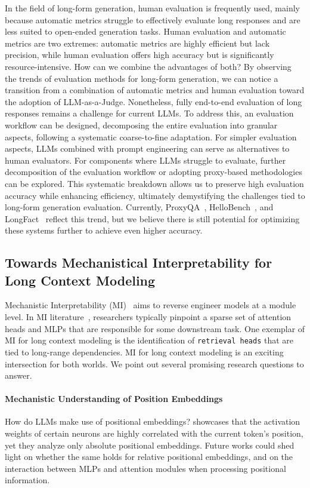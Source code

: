 \documentclass[11pt, a4paper, logo, copyright, nonumbering]{map}
\begin{document}
In the field of long-form generation, human evaluation is frequently used, mainly because automatic metrics struggle to effectively evaluate long responses and are less suited to open-ended generation tasks. 
Human evaluation and automatic metrics are two extremes: automatic metrics are highly efficient but lack precision, while human evaluation offers high accuracy but is significantly resource-intensive. How can we combine the advantages of both? 
By observing the trends of evaluation methods for long-form generation, we can notice a transition from a combination of automatic metrics and human evaluation toward the adoption of LLM-as-a-Judge. 
Nonetheless, fully end-to-end evaluation of long responses remains a challenge for current LLMs. To address this, an evaluation workflow can be designed, decomposing the entire evaluation into granular aspects, following a systematic coarse-to-fine adaptation. For simpler evaluation aspects, LLMs combined with prompt engineering can serve as alternatives to human evaluators. 
For components where LLMs struggle to evaluate, further decomposition of the evaluation workflow or adopting proxy-based methodologies can be explored. This systematic breakdown allows us to preserve high evaluation accuracy while enhancing efficiency, ultimately demystifying the challenges tied to long-form generation evaluation. 
Currently, ProxyQA~\citep{tan2024proxyqa}, HelloBench~\citep{que2024hellobench}, and LongFact~\citep{wei2024long} reflect this trend, but we believe there is still potential for optimizing these systems further to achieve even higher accuracy.


\subsection{Towards Mechanistical Interpretability for Long Context Modeling}
Mechanistic Interpretability (MI)~\citep{nanda2023mechanistic} aims to reverse engineer models at a module level. In MI literature~\citep{meng2022locating,arith_head_icml,wang_interpretability_wild_2023}, researchers typically pinpoint a sparse set of attention heads and MLPs that are responsible for some downstream task.
One exemplar of MI for long context modeling is the identification of \texttt{retrieval heads} \citep{wu2025retrieval_head} that are tied to long-range dependencies. MI for long context modeling is an exciting intersection for both worlds. We point out several promising research questions to answer.

\paragraph{Mechanistic Understanding of Position Embeddings}
How do LLMs make use of positional embeddings? \citet{voita-etal-2024-neurons_func} showcases that the activation weights of certain neurons are highly correlated with the current token's position, yet they analyze only absolute positional embeddings. Future works could shed light on whether the same holds for relative positional embeddings, and on the interaction between MLPs and attention modules when processing positional information. 
\end{document}
